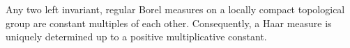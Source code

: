 Any two left invariant, regular Borel measures on a locally compact topological group are constant multiples of each other. Consequently, a Haar measure is uniquely determined up to a positive multiplicative constant.

